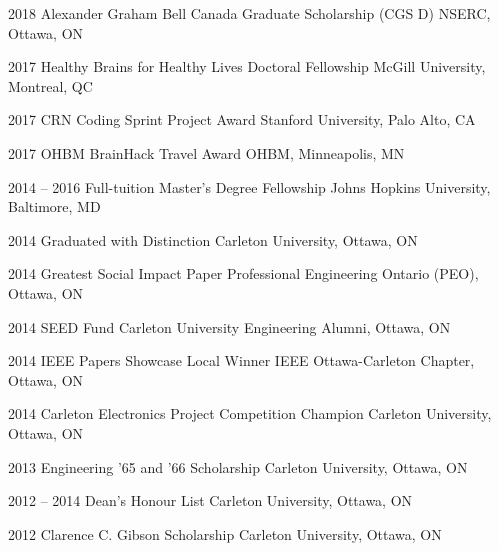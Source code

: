\documentclass[]{friggeri-cv} %
\begin{document}
\begin{entrylist}
\vspace{-7pt}

\entry
{2018}
{Alexander Graham Bell Canada Graduate Scholarship (CGS D)}
{NSERC, Ottawa, ON}
{}
\vspace{-7pt}

\entry
{2017}
{Healthy Brains for Healthy Lives Doctoral Fellowship}
{McGill University, Montreal, QC}
{}
\vspace{-7pt}

\entry
{2017}
{CRN Coding Sprint Project Award}
{Stanford University, Palo Alto, CA}
{}
\vspace{-7pt}

\entry
{2017}
{OHBM BrainHack Travel Award}
{OHBM, Minneapolis, MN}
{}
\vspace{-7pt}

\entry
{2014 -- 2016}
{Full-tuition Master's Degree Fellowship}
{Johns Hopkins University, Baltimore, MD}
{}
\vspace{-7pt}

\entry
{2014}
{Graduated with Distinction}
{Carleton University, Ottawa, ON}
{}
\vspace{-7pt}

\entry
{2014}
{Greatest Social Impact Paper}
{Professional Engineering Ontario (PEO), Ottawa, ON}
{}
\vspace{-7pt}

\entry
{2014}
{SEED Fund}
{Carleton University Engineering Alumni, Ottawa, ON}
{}
\vspace{-7pt}

\entry
{2014}
{IEEE Papers Showcase Local Winner}
{IEEE Ottawa-Carleton Chapter, Ottawa, ON}
{}
\vspace{-7pt}

\entry
{2014}
{Carleton Electronics Project Competition Champion}
{Carleton University, Ottawa, ON}
{}
\vspace{-7pt}

\entry
{2013}
{Engineering '65 and '66 Scholarship}
{Carleton University, Ottawa, ON}
{}
\vspace{-7pt}

\entry
{2012 -- 2014}
{Dean's Honour List}
{Carleton University, Ottawa, ON}
{}
\vspace{-7pt}

\entry
{2012}
{Clarence C. Gibson Scholarship}
{Carleton University, Ottawa, ON}
{}
\vspace{-7pt}
\end{entrylist}
\end{document}
